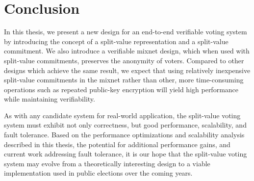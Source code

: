 \chapter{Conclusion}

In this thesis, we present a new design for an end-to-end verifiable voting system by introducing the concept of a split-value representation and a split-value commitment. We also introduce a verifiable mixnet design, which when used with split-value commitments, preserves the anonymity of voters. Compared to other designs which achieve the same result, we expect that using relatively inexpensive split-value commitments in the mixnet rather than other, more time-consuming operations such as repeated public-key encryption will yield high performance while maintaining verifiability.

As with any candidate system for real-world application, the split-value voting system must exhibit not only correctness, but good performance, scalability, and fault tolerance. Based on the performance optimizations and scalability analysis described in this thesis, the potential for additional performance gains, and current work addressing fault tolerance, it is our hope that the split-value voting system may evolve from a theoretically interesting design to a viable implementation used in public elections over the coming years.
